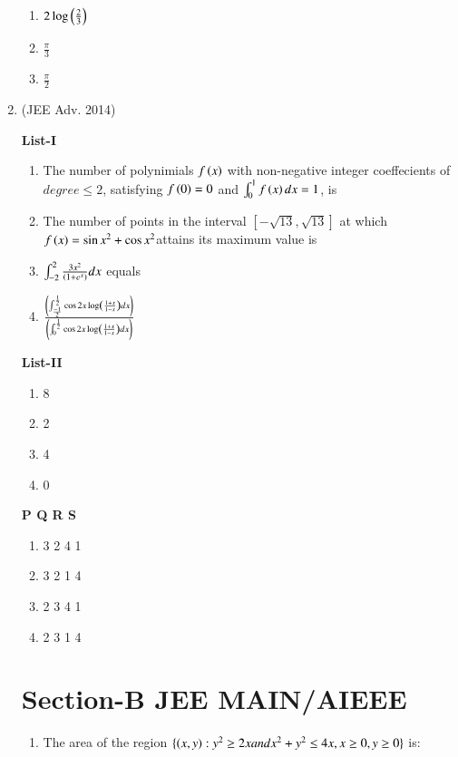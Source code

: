 \documentclass[journal,12pt,twocolumn]{IEEEtran}
\theoremstyle{remark}
\begin{document}
\begin{enumerate}
\begin{multicols}{2}
\begin{enumerate}
					\item $2\log\left(\frac{2}{3}\right)$

					\item $\frac{\pi}{3}$

					\item $\frac{\pi}{2}$
				\end{enumerate}
			\end{multicols}


		\item \hfill{(JEE Adv. 2014)}
			\begin{multicols}{2}
				\textbf{List-I} 
				\begin{enumerate}
					\item The number of polynimials $f\left(x\right)$ with non-negative integer coeffecients of $degree \leq 2$, satisfying $f\left(0\right)=0$ and $\int_{0}^{1}f\left(x\right)dx=1$, is
					\item The number of points in the interval $\left[-\sqrt{13},\sqrt{13}\right]$ at which $f\left(x\right)= \sin x^{2}+\cos x^{2}$attains its maximum value is
					\item $\int_{-2}^{2}\frac{3x^{2}}{\left(1+e^{x}\right)}dx$ equals
					\item $\frac{\left(\int_{\frac{-1}{2}}^{\frac{1}{2}}\cos 2x\log\left(\frac{1+x}{1-x}\right)dx\right)}{\left(\int_{0}^{\frac{1}{2}}\cos 2x\log\left(\frac{1+x}{1-x}\right)dx\right)}$
				\end{enumerate}
				\columnbreak
				\textbf{List-II}
				\begin{enumerate}
					\item 8

					\item 2

					\item 4

					\item 0
				\end{enumerate}
		\end{multicols}
			\textbf{   P Q R S}
			\begin{enumerate}
		
				\item 3 2 4 1
				\item 3 2 1 4
				\item 2 3 4 1 
				\item 2 3 1 4
			\end{enumerate}
\twocolumn
\section*{\textbf{Section-B} JEE MAIN/AIEEE }
\begin{enumerate}
	\item The area  of the region $\{\left(x,y\right):y^{2}\geq 2x and x^{2}+y^{2}\leq 4x, x\geq0, y\geq0\}$ is:


\end{enumerate}
\end{enumerate}
\end{document}
